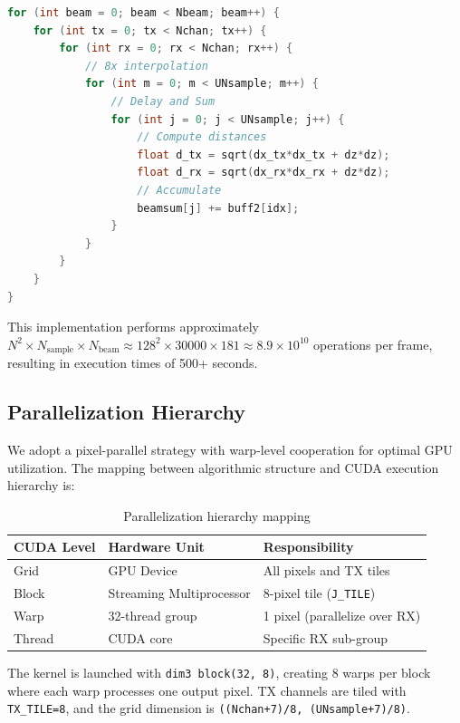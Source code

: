 \documentclass{article}
\begin{document}
\begin{lstlisting}[language=C++]
for (int beam = 0; beam < Nbeam; beam++) {
    for (int tx = 0; tx < Nchan; tx++) {
        for (int rx = 0; rx < Nchan; rx++) {
            // 8x interpolation
            for (int m = 0; m < UNsample; m++) {
                // Delay and Sum
                for (int j = 0; j < UNsample; j++) {
                    // Compute distances
                    float d_tx = sqrt(dx_tx*dx_tx + dz*dz);
                    float d_rx = sqrt(dx_rx*dx_rx + dz*dz);
                    // Accumulate
                    beamsum[j] += buff2[idx];
                }
            }
        }
    }
}
\end{lstlisting}

This implementation performs approximately $N^2 \times N_{\text{sample}} \times N_{\text{beam}} \approx 128^2 \times 30000 \times 181 \approx 8.9 \times 10^{10}$ operations per frame, resulting in execution times of 500+ seconds.

\subsection{Parallelization Hierarchy}

We adopt a pixel-parallel strategy with warp-level cooperation for optimal GPU utilization. The mapping between algorithmic structure and CUDA execution hierarchy is:

\begin{table}[H]
\centering
\begin{tabular}{lll}
\toprule
\textbf{CUDA Level} & \textbf{Hardware Unit} & \textbf{Responsibility} \\
\midrule
Grid & GPU Device & All pixels and TX tiles \\
Block & Streaming Multiprocessor & 8-pixel tile (\texttt{J\_TILE}) \\
Warp & 32-thread group & 1 pixel (parallelize over RX) \\
Thread & CUDA core & Specific RX sub-group \\
\bottomrule
\end{tabular}
\caption{Parallelization hierarchy mapping}
\label{tab:hierarchy}
\end{table}

The kernel is launched with \texttt{dim3 block(32, 8)}, creating 8 warps per block where each warp processes one output pixel. TX channels are tiled with \texttt{TX\_TILE=8}, and the grid dimension is \texttt{((Nchan+7)/8, (UNsample+7)/8)}.
\end{document}

